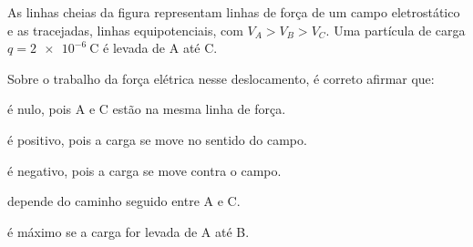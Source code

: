 \begin{questao}[2]{}

As linhas cheias da figura representam linhas de força de um campo eletrostático
e as tracejadas, linhas equipotenciais, com $V_A > V_B > V_C$. Uma partícula de
carga $q = \SI{2e-6}{\coulomb}$ é levada de A até C.


Sobre o trabalho da força elétrica nesse deslocamento, é correto afirmar que:
\begin{alternativas}
\item é nulo, pois A e C estão na mesma linha de força.
\item é positivo, pois a carga se move no sentido do campo.
\item é negativo, pois a carga se move contra o campo.
\item depende do caminho seguido entre A e C.
\item é máximo se a carga for levada de A até B.
\end{alternativas}


\end{questao}
